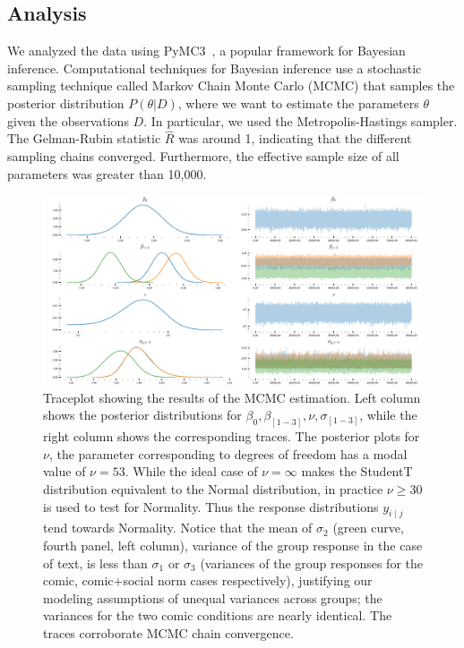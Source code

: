 
\subsection{Analysis}
\label{sub:Analysis}

We analyzed the data using PyMC3~\cite{Salvatier2016}, a popular framework for Bayesian inference. Computational techniques for Bayesian inference use a stochastic sampling technique called Markov Chain Monte Carlo (MCMC) that samples the posterior distribution $P(\theta | D)$, where we want to estimate the parameters $\theta$ given the observations $D$. In particular, we used the Metropolis-Hastings sampler. The Gelman-Rubin statistic $\hat{R}$ was around 1, indicating that the different sampling chains converged. Furthermore, the effective sample size of all parameters was greater than 10,000.

\begin{figure}[htb]
	\includegraphics[width=1\textwidth]{./hari-code/robust_traceplot.pdf}
    \caption{Traceplot showing the results of the MCMC estimation. Left column shows the posterior distributions for $\beta_0, \beta_{[1-3]}, \nu, \sigma_{[1-3]}$, while the right column shows the corresponding traces. The posterior plots for $\nu$, the parameter corresponding to degrees of freedom has a modal value of $\nu=53$. While the ideal case of $\nu=\infty$ makes the StudentT distribution equivalent to the Normal distribution, in practice $\nu \geq 30$ is used to test for Normality. Thus the response distributions $y_{i \mid j}$ tend towards Normality. Notice that the mean of $\sigma_2$ (green curve, fourth panel, left column), variance of the group response in the case of text, is less than $\sigma_1$ or $\sigma_3$ (variances of the group responses for the comic, comic+social norm cases respectively), justifying our modeling assumptions of unequal variances across groups; the variances for the two comic conditions are nearly identical. The traces corroborate MCMC chain convergence. }
	\label{fig:traceplot}
\end{figure}



